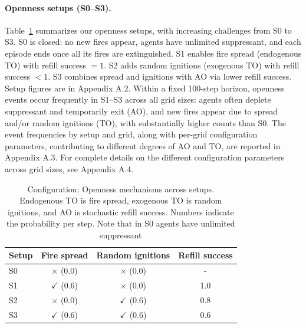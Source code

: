 \paragraph{Openness setups (S0--S3).}



Table~\ref{tab:setup_summary} summarizes our  openness setups, with increasing challenges from S0 to S3.  
S0 is closed: no new fires appear, agents have unlimited suppressant, and each episode ends once all its fires are extinguished.
S1 enables fire spread (endogenous TO) with refill success $=1$.
S2 adds random ignitions (exogenous TO) with refill success $<1$.
S3 combines spread and ignitions with AO via lower refill success. 
Setup figures are in Appendix A.2. Within a fixed 100-step horizon, openness events occur frequently in S1--S3 across all grid sizes: agents often deplete suppressant and temporarily exit (AO), and new fires appear due to spread and/or random ignitions (TO), with substantially higher counts than S0. The event frequencies by setup and grid, along with per-grid configuration parameters, contributing to different degrees of AO and TO, are reported in Appendix A.3. For complete details on the different configuration parameters across grid sizes, see Appendix A.4.


\begin{table} [h]
\centering
\footnotesize
\setlength{\tabcolsep}{3pt}
\renewcommand{\arraystretch}{1.05}

\begin{tabular}{lccc}
\toprule
\textbf{Setup} & \textbf{Fire spread} & \textbf{Random ignitions} & \textbf{Refill success} \\
\midrule
S0 & $\times$ (0.0) & $\times$ (0.0) & - \\
S1 & $\checkmark$ (0.6) & $\times$ (0.0) & 1.0 \\
S2 & $\times$ (0.0) & $\checkmark$ (0.6) & 0.8 \\
S3 & $\checkmark$ (0.6) & $\checkmark$ (0.6) & 0.6 \\
\bottomrule
\end{tabular}
\caption{Configuration: Openness mechanisms across setups. Endogenous TO is fire spread, exogenous TO is random ignitions, and AO is stochastic refill success. Numbers indicate the probability per step. Note that in S0 agents have unlimited suppressant}
\label{tab:setup_summary}
\end{table}




